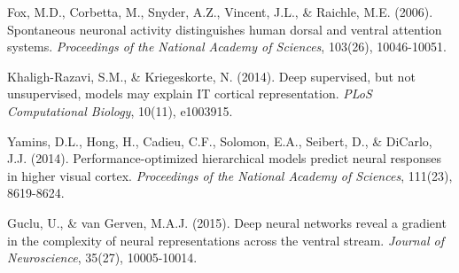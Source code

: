 \documentclass[11pt,letterpaper]{article}
\begin{document}
\begin{list}{}{\setlength{\leftmargin}{2em}\setlength{\itemindent}{-2em}\setlength{\itemsep}{2pt}}
\item[{[R9]}] Fox, M.D., Corbetta, M., Snyder, A.Z., Vincent, J.L., \& Raichle, M.E. (2006). Spontaneous neuronal activity distinguishes human dorsal and ventral attention systems. \textit{Proceedings of the National Academy of Sciences}, 103(26), 10046-10051.
\item[{[R10]}] Khaligh-Razavi, S.M., \& Kriegeskorte, N. (2014). Deep supervised, but not unsupervised, models may explain IT cortical representation. \textit{PLoS Computational Biology}, 10(11), e1003915.
\item[{[R11]}] Yamins, D.L., Hong, H., Cadieu, C.F., Solomon, E.A., Seibert, D., \& DiCarlo, J.J. (2014). Performance-optimized hierarchical models predict neural responses in higher visual cortex. \textit{Proceedings of the National Academy of Sciences}, 111(23), 8619-8624.
\item[{[R12]}] Guclu, U., \& van Gerven, M.A.J. (2015). Deep neural networks reveal a gradient in the complexity of neural representations across the ventral stream. \textit{Journal of Neuroscience}, 35(27), 10005-10014.
\end{list}
\endgroup
\end{document}
